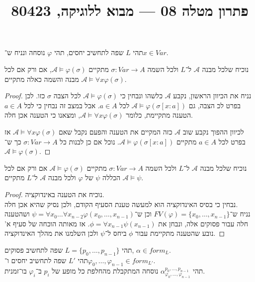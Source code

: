 
\title{פתרון מטלה 08 --- מבוא ללוגיקה, 80423}


\maketitle
\maketitleprint{}

\question{}
תהי $L$ שפה לתחשיב יחסים, תהי $\varphi$ נוסחה ונניח ש־$x \in Var$.

\subquestion{}
נוכיח שלכל מבנה $\mathcal{A}$ ל־$L$ ולכל השמה $\sigma : Var \to A$ מתקיים $\mathcal{A} \models \varphi(\sigma)$, אם ורק אם לכל מבנה והשמה כאלה מתקיים $\mathcal{A} \models \forall x \varphi(\sigma)$.
\begin{proof}
	נניח את הכיוון הראשון, נקבע $\mathcal{A}$ כלשהו ונבחין כי $\mathcal{A} \models \varphi(\sigma)$ לכל הצבה $\sigma$ כזו.
	לכן בפרט לכ הצבה, גם $\mathcal{A} \models \varphi(\sigma[x : a])$ לכל $a \in A$.
	אבל במצב זה נבחין כי לכל $a \in A$ הטענה מתקיימת, כלומר $\mathcal{A} \models \forall x \varphi(\sigma)$, ומצאנו כי הטענה אכן חלה.

	לכיוון ההפוך נקבע שוב $\mathcal{A}$ כזה המקיים את הטענה והפעם נקבל שאם $\mathcal{A} \models \forall x \varphi(\sigma)$ אז בפרט לכל $a \in A$ מתקיים $\mathcal{A} \models \varphi(\sigma[x : a])$.
	נוכל אם כן לבנות כל $\sigma : Var \to A$ כך ש־$\mathcal{A} \models \varphi(\sigma)$.
\end{proof}

\subquestion{}
נוכיח שלכל מבנה $\mathcal{A}$ ל־$L$ ולכל השמה $\sigma : Var \to A$ מתקיים $\mathcal{A} \models \varphi(\sigma)$ אם ורק אם לכל הכללה $\psi$ של $\varphi$ ולכל מבנה $\mathcal{A}$ ל־$L$ מתקיים $\mathcal{A} \models \psi$.
\begin{proof}
	נוכיח את הטענה באינדוקציה. \\
	נבחין כי בסיס האינדוקציה הוא למעשה טענת הסעיף הקודם, ולכן נסיק שהיא אכן חלה. \\
	נניח ש־$FV(\varphi) = \{ x_0, \dots, x_{n - 1} \}$ וכן ש־$\psi = \forall x_0 \dots \forall x_{n - 2} \varphi(x_0, \dots, x_{n - 1})$ ושהטענה חלה עבור פסוקים אלה, ונבחן את $\phi = \forall x_{n - 1} \psi(x_{n - 1})$.
	אז מאותה הוכחה של סעיף א' נובע שהטענה מתקיימת עבור $\phi$ ביחס ל־$\psi$ ולכן השלמנו את מהלך האינדוקציה.
\end{proof}

\question{}
תהי $L = \{ p_0, \dots, p_{n - 1} \}$ שפה לתחשיב פסוקים, $\alpha \in form_L$. \\
תהי $L'$ שפה לתחשיב יחסים ו־$\varphi_0, \dots, \varphi_{n - 1} \in form_{L'}$. \\
תהי $\alpha_{\varphi_0, \dots, \varphi_{n - 1}}^{p_0, \dots, p_{n - 1}}$ נוסחה המתקבלת מהחלפת כל מופע של $p_i$ ב־$\varphi_i$ בו־זמנית.

